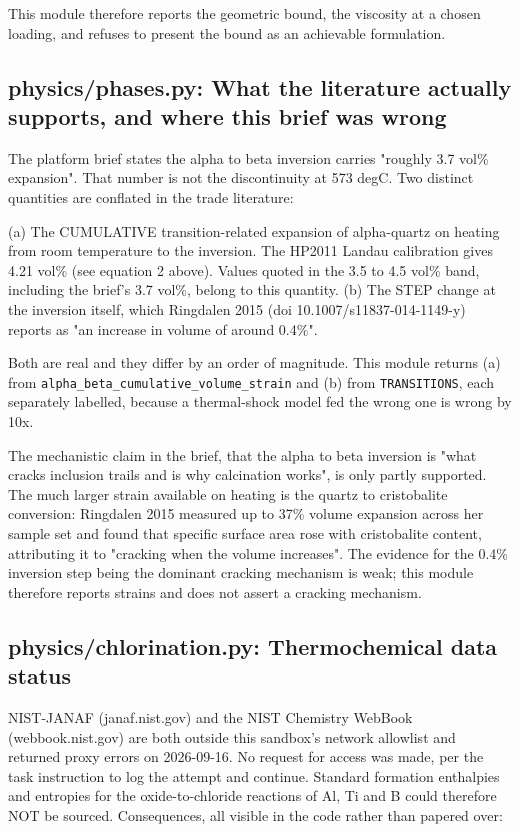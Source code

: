 \documentclass[10pt,a4paper,twoside]{report}
\begin{document}
This module therefore reports the geometric bound, the viscosity at a chosen loading, and refuses to present the bound as an achievable formulation.

\subsection{physics/phases.py: What the literature actually supports, and where this brief was wrong}

The platform brief states the alpha to beta inversion carries "roughly 3.7 vol\% expansion". That number is not the discontinuity at 573 degC. Two distinct quantities are conflated in the trade literature:

(a) The CUMULATIVE transition-related expansion of alpha-quartz on heating from room temperature to the inversion. The HP2011 Landau calibration gives 4.21 vol\% (see equation 2 above). Values quoted in the 3.5 to 4.5 vol\% band, including the brief's 3.7 vol\%, belong to this quantity. (b) The STEP change at the inversion itself, which Ringdalen 2015 (doi 10.1007/s11837-014-1149-y) reports as "an increase in volume of around 0.4\%".

Both are real and they differ by an order of magnitude. This module returns (a) from \texttt{alpha\_beta\_cumulative\_volume\_strain} and (b) from \texttt{TRANSITIONS}, each separately labelled, because a thermal-shock model fed the wrong one is wrong by 10x.

The mechanistic claim in the brief, that the alpha to beta inversion is "what cracks inclusion trails and is why calcination works", is only partly supported. The much larger strain available on heating is the quartz to cristobalite conversion: Ringdalen 2015 measured up to 37\% volume expansion across her sample set and found that specific surface area rose with cristobalite content, attributing it to "cracking when the volume increases". The evidence for the 0.4\% inversion step being the dominant cracking mechanism is weak; this module therefore reports strains and does not assert a cracking mechanism.

\subsection{physics/chlorination.py: Thermochemical data status}

NIST-JANAF (janaf.nist.gov) and the NIST Chemistry WebBook (webbook.nist.gov) are both outside this sandbox's network allowlist and returned proxy errors on 2026-09-16. No request for access was made, per the task instruction to log the attempt and continue. Standard formation enthalpies and entropies for the oxide-to-chloride reactions of Al, Ti and B could therefore NOT be sourced. Consequences, all visible in the code rather than papered over:
\end{document}
